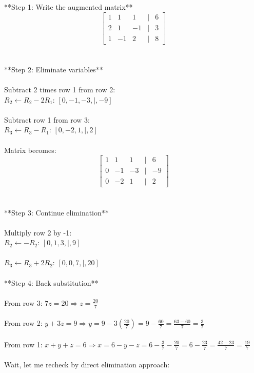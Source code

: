 \documentclass[11pt]{article}
\begin{document}
**Step 1: Write the augmented matrix**\\
\[\begin{bmatrix} 1 & 1 & 1 & | & 6 \\ 2 & 1 & -1 & | & 3 \\ 1 & -1 & 2 & | & 8 \end{bmatrix}\]\\
\\
**Step 2: Eliminate variables**\\
\\
Subtract 2 times row 1 from row 2:\\
\(R_2 \leftarrow R_2 - 2R_1\): \([0, -1, -3, |, -9]\)\\
\\
Subtract row 1 from row 3:\\
\(R_3 \leftarrow R_3 - R_1\): \([0, -2, 1, |, 2]\)\\
\\
Matrix becomes:\\
\[\begin{bmatrix} 1 & 1 & 1 & | & 6 \\ 0 & -1 & -3 & | & -9 \\ 0 & -2 & 1 & | & 2 \end{bmatrix}\]\\
\\
**Step 3: Continue elimination**\\
\\
Multiply row 2 by -1:\\
\(R_2 \leftarrow -R_2\): \([0, 1, 3, |, 9]\)\\
\\
\(R_3 \leftarrow R_3 + 2R_2\): \([0, 0, 7, |, 20]\)\\
\\
**Step 4: Back substitution**\\
\\
From row 3: \(7z = 20 \Rightarrow z = \frac{20}{7}\)\\
\\
From row 2: \(y + 3z = 9 \Rightarrow y = 9 - 3(\frac{20}{7}) = 9 - \frac{60}{7} = \frac{63-60}{7} = \frac{3}{7}\)\\
\\
From row 1: \(x + y + z = 6 \Rightarrow x = 6 - y - z = 6 - \frac{3}{7} - \frac{20}{7} = 6 - \frac{23}{7} = \frac{42-23}{7} = \frac{19}{7}\)\\
\\
Wait, let me recheck by direct elimination approach:\\
\\
\end{document}
